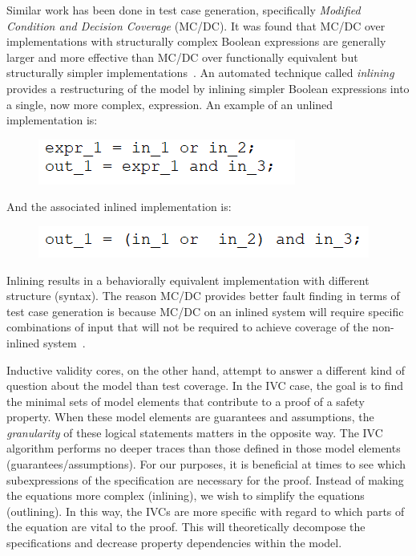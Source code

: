 Similar work has been done in test case generation, specifically \emph{Modified Condition and Decision Coverage} (MC/DC). It was found that MC/DC over implementations with structurally complex Boolean expressions are generally larger and more effective than MC/DC over functionally equivalent but structurally simpler implementations~\cite{gay2016effect}. An automated technique called \emph{inlining} provides a restructuring of the model by inlining simpler Boolean expressions into a single, now more complex, expression. An example of an unlined implementation is: 

\begin{figure}[h]
	\begin{center}
		\includegraphics[scale=1.0]{images/uninlinedEx.PNG}
	\end{center}
	\vspace{-1.5em}
\end{figure}

And the associated inlined implementation is: 

\begin{figure}[h]
	\begin{center}
		\includegraphics[scale=1.0]{images/inlined.PNG}
	\end{center}
	\vspace{-1.5em}
\end{figure}

Inlining results in a behaviorally equivalent implementation with different structure (syntax). The reason MC/DC provides better fault finding in terms of test case generation is because MC/DC on an inlined system will require specific combinations of input that will not be required to achieve coverage of the non-inlined system~\cite{gay2016effect}. 

Inductive validity cores, on the other hand, attempt to answer a different kind of question about the model than test coverage. In the IVC case, the goal is to find the minimal sets of model elements that contribute to a proof of a safety property. When these model elements are guarantees and assumptions, the \emph{granularity} of these logical statements matters in the opposite way. The IVC algorithm performs no deeper traces than those defined in those model elements (guarantees/assumptions). For our purposes, it is beneficial at times to see which subexpressions of the specification are necessary for the proof. Instead of making the equations more complex (inlining), we wish to simplify the equations (outlining). In this way, the IVCs are more specific with regard to which parts of the equation are vital to the proof. This will theoretically decompose the specifications and decrease property dependencies within the model. 

